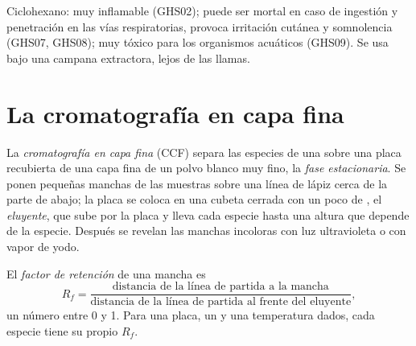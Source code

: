\begin{safety}{}
Ciclohexano: muy inflamable (GHS02); puede ser mortal en caso de
ingestión y penetración en las vías respiratorias, provoca irritación
cutánea y somnolencia (GHS07, GHS08); muy tóxico para los organismos
acuáticos (GHS09). Se usa bajo una campana extractora, lejos de las
llamas.
\end{safety}

\section{La cromatografía en capa fina}

\begin{definition}\label{def:g10:chemical-species:tlc}
La \emph{cromatografía en capa fina}
(CCF) separa las especies de una  sobre una placa recubierta de una
capa fina de un polvo blanco muy fino, la
\emph{fase estacionaria}. Se ponen pequeñas
manchas de las muestras sobre una línea de lápiz cerca de la parte de
abajo; la placa se coloca en una cubeta cerrada con un poco de
, el \emph{eluyente}, que sube por la placa y
lleva cada especie hasta una altura que depende de la especie. Después
se revelan las manchas incoloras con luz ultravioleta o con vapor de
yodo.
\end{definition}

\begin{definition}\label{def:g10:chemical-species:retention-factor}
El \emph{factor de retención} de una mancha
es
\[
  R_f = \frac{\text{distancia de la línea de partida a la mancha}}
             {\text{distancia de la línea de partida al frente del eluyente}},
\]
un número entre 0 y 1. Para una placa, un  y una temperatura
dados, cada especie tiene su propio $R_f$.
\end{definition}

